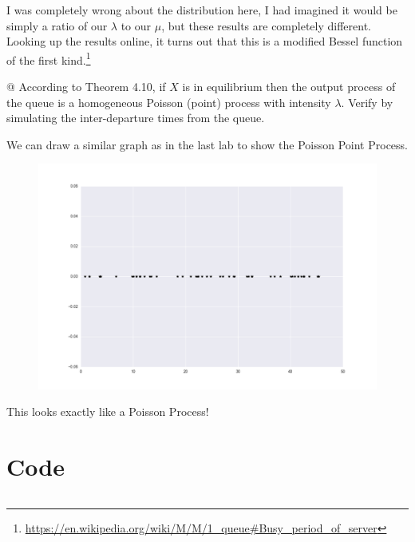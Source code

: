 \documentclass[10pt]{article}
\begin{document}
\begin{easylist}[enumerate]
    I was completely wrong about the distribution here, I had imagined it would
    be simply a ratio of our $\lambda$ to our $\mu$, but these results are
    completely different. Looking up the results online, it turns out that this
    is a modified Bessel function of the first
    kind.\footnote{\url{https://en.wikipedia.org/wiki/M/M/1_queue\#Busy_period_of_server}}

    \vspace{0.5cm}
    @ According to Theorem 4.10, if $X$ is in equilibrium then the output
    process of the queue is a homogeneous Poisson (point) process with intensity
    $\lambda$. Verify by simulating the inter-departure times from the queue.
    \vspace{0.5cm}

    We can draw a similar graph as in the last lab to show the Poisson Point
    Process.

    \begin{figure}[H]
        \centering
        \includegraphics[scale=0.3]{./poissonprocess.png}
    \end{figure}

    This looks exactly like a Poisson Process!

\end{easylist}

\newpage
\appendix
\section{Code}\label{app:code}

\inputminted{python}{lab3.py}
\end{document}
